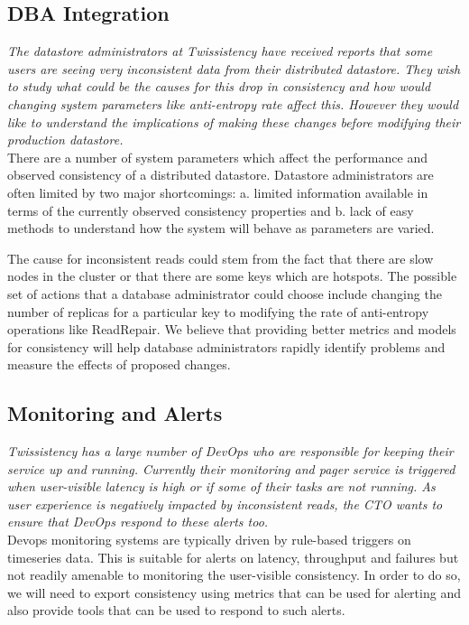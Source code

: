 \subsection{DBA Integration}

\textit{The datastore administrators at Twissistency have received reports that
  some users are seeing very inconsistent data from their distributed datastore. 
  They wish to study what could be the causes for this drop in consistency and
  how would changing system parameters like anti-entropy rate affect this.
  However they would like to understand the implications of making these changes 
  before modifying their production datastore.}\\

There are a number of system parameters which affect the performance and
observed consistency of a distributed datastore. Datastore administrators are
often limited by two major shortcomings: a. limited information available in terms
of the currently observed consistency properties and b. lack of easy methods to
understand how the system will behave as parameters are varied.

The cause for inconsistent reads could stem from the fact that there are slow
nodes in the cluster or that there are some keys which are hotspots. The
possible set of actions that a database administrator could choose include
changing the number of replicas for a particular key to modifying the rate of
anti-entropy operations like ReadRepair. We believe that providing better
metrics and models for consistency will help database administrators rapidly 
identify problems and measure the effects of proposed changes.


\subsection{Monitoring and Alerts}

\textit{Twissistency has a large number of DevOps who are responsible for
  keeping their service up and running. Currently their monitoring and pager
  service is triggered when user-visible latency is high or if some of their
  tasks are not running. As user experience is negatively impacted by
  inconsistent reads, the CTO wants to ensure that DevOps respond to these
  alerts too.}\\


Devops monitoring systems are typically driven by rule-based triggers on
timeseries data. This is suitable for alerts on latency, throughput and failures
but not readily amenable to monitoring the user-visible consistency. In order to
do so, we will need to export consistency using metrics that can be used for
alerting and also provide tools that can be used to respond to such alerts. 
